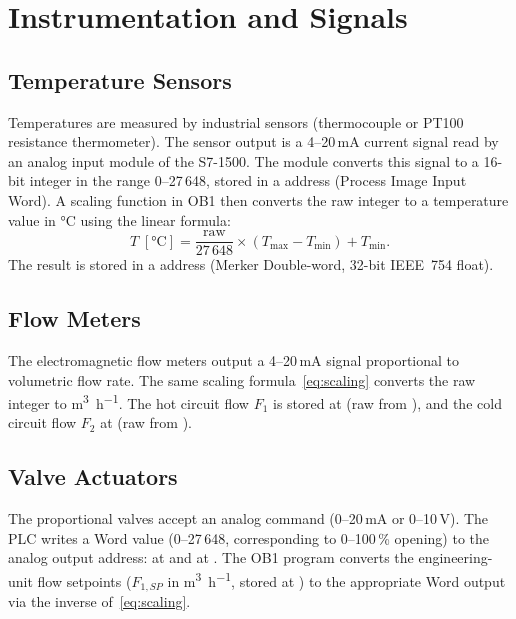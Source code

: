 \section{Instrumentation and Signals}

\subsection{Temperature Sensors}

Temperatures are measured by industrial sensors (thermocouple or PT100 resistance
thermometer). The sensor output is a 4--20\,mA current signal read by an analog input
module of the S7-1500. The module converts this signal to a 16-bit integer in the range
0--27\,648, stored in a  address (Process Image Input Word). A scaling
function in OB1 then converts the raw integer to a temperature value in \si{\degreeCelsius}
using the linear formula:
\begin{equation}
  T \;[\si{\degreeCelsius}]
  = \frac{\text{raw}}{27\,648} \times (T_{\max} - T_{\min}) + T_{\min}.
  \label{eq:scaling}
\end{equation}
The result is stored in a  address (Merker Double-word, 32-bit IEEE~754 float).

\subsection{Flow Meters}

The electromagnetic flow meters output a 4--20\,mA signal proportional to volumetric flow
rate. The same scaling formula~\eqref{eq:scaling} converts the raw  integer to
\si{\metre\cubed\per\hour}. The hot circuit flow $F_1$ is stored at 
(raw from ), and the cold circuit flow $F_2$ at 
(raw from ).

\subsection{Valve Actuators}

The proportional valves accept an analog command (0--20\,mA or 0--10\,V). The PLC writes
a Word value (0--27\,648, corresponding to 0--100\,\% opening) to the analog output address:
 at  and  at .
The OB1 program converts the engineering-unit flow setpoints ($F_{1,SP}$ in
\si{\metre\cubed\per\hour}, stored at ) to the appropriate Word output via
the inverse of~\eqref{eq:scaling}.

